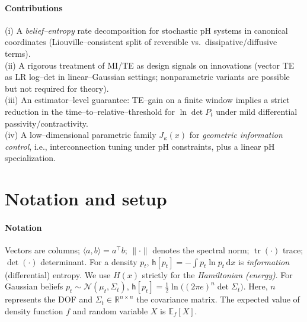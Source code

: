 \documentclass[final,5p,times,twocolumn]{elsarticle}
\DeclareMathOperator{\tr}{tr}
\newcommand{\diff}{\mathrm{d}}
\begin{document}
	
	\paragraph*{Contributions}
	(i) A \emph{belief--entropy} rate decomposition for stochastic pH systems in canonical coordinates (Liouville--consistent split of reversible vs.\ dissipative/diffusive terms).\\
	(ii) A rigorous treatment of MI/TE as design signals on innovations (vector TE as LR log--det in linear--Gaussian settings; nonparametric variants are possible but not required for theory).\\
	(iii) An estimator--level guarantee: TE--gain on a finite window implies a strict reduction in the time--to--relative--threshold for \(\ln\det P_t\) under mild differential passivity/contractivity.\\
	(iv) A low--dimensional parametric family \(J_{\kappa}(x)\) for \emph{geometric information control}, i.e., interconnection tuning under pH constraints, plus a linear pH specialization.
	
	\section{Notation and setup}\label{sec:notation}
	\paragraph*{Notation}
	Vectors are columns; \(\langle a,b\rangle = a^\top b\); \(\|\cdot\|\) denotes the spectral norm; \(\tr(\cdot)\) trace; \(\det(\cdot)\) determinant. For a density \(p_t\), \(\mathsf h[p_t] = -\int p_t\ln p_t\,\diff x\) is \emph{information} (differential) entropy. We use \(H(x)\) strictly for the \emph{Hamiltonian (energy)}. For Gaussian beliefs \(p_t\sim\mathcal N(\mu_t,\Sigma_t)\), \(\mathsf h[p_t]=\frac12\ln\!\big((2\pi e)^n\det \Sigma_t\big)\). Here,  $n$ represents the DOF and $\Sigma_t\in \mathbb{R}^{n\times n}$ the covariance matrix. The expected value of density function $f$ and random variable $X$ is $\mathbb{E}_{f}[X]$.
	
\end{document}
